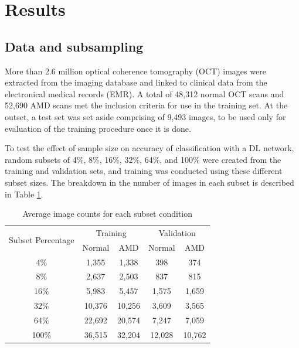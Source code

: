 \section{Results}

\subsection{Data and subsampling}

More than 2.6 million optical coherence tomography (OCT) images were extracted
from the imaging database and linked to clinical data from the electronical
medical records (EMR). A total of 48,312 normal OCT scans and 52,690 AMD scans
met the inclusion criteria for use in the training set. At the outset, a test
set was set aside comprising of 9,493 images, to be used only for evaluation of
the training procedure once it is done.

To test the effect of sample size on accuracy of classification with a DL
network, random subsets of 4\%, 8\%, 16\%, 32\%, 64\%, and 100\% were created
from the training and validation sets, and training was conducted using these different subset sizes. The breakdown in the number of images in each subset is described in
Table \ref{table_counts}.

\begin{table}[!t]
\renewcommand{\arraystretch}{1.1}
\caption{Average image counts for each subset condition}
\label{table_counts}
\centering
\begin{tabular}{ccccc}
\hline
\multirow{2}{*}{Subset Percentage} & \multicolumn{2}{c}{Training} & \multicolumn{2}{c}{Validation}  \\
	 & Normal & AMD & Normal & AMD \\
\hline
4\%   & 1,355 & 1,338 & 398 & 374 \\
8\%   & 2,637 & 2,503 & 837 & 815 \\
16\%   & 5,983 & 5,457 & 1,575 & 1,659 \\
32\%   & 10,376 & 10,256 & 3,609 & 3,565 \\
64\%   & 22,692 & 20,574 & 7,247 & 7,059 \\
100\%   & 36,515 & 32,204 & 12,028 & 10,762 \\
\hline
\end{tabular}
\end{table}

